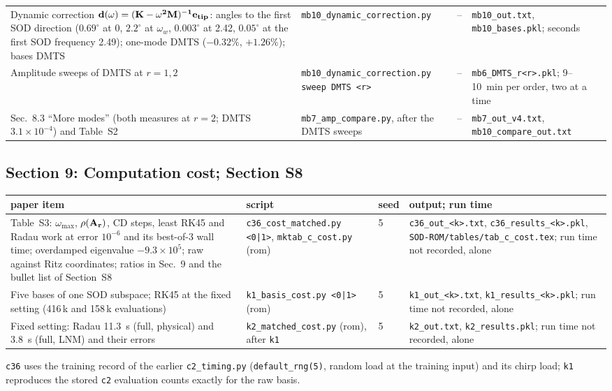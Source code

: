 \documentclass[10pt]{article}
\newcommand{\f}[1]{\texttt{#1}}
\begin{document}
\begin{longtable}{L{0.31\textwidth}L{0.25\textwidth}L{0.08\textwidth}L{0.25\textwidth}}
Dynamic correction $\bf d(\omega)=(K-\omega^2 M)^{-1}e_{tip}$: angles to the first SOD direction ($0.69^\circ$ at 0, $2.2^\circ$ at $\omega_w$, $0.003^\circ$ at 2.42, $0.05^\circ$ at the first SOD frequency 2.49); one-mode DMTS ($-0.32\%$, $+1.26\%$); bases DMTS & \f{mb10\_\allowbreak{}dynamic\_\allowbreak{}correction.py} & -- & \f{mb10\_\allowbreak{}out.txt}, \f{mb10\_\allowbreak{}bases.pkl}; seconds\\
Amplitude sweeps of DMTS at $r=1,2$ & \f{mb10\_\allowbreak{}dynamic\_\allowbreak{}correction.py sweep DMTS <r>} & -- & \f{mb6\_\allowbreak{}DMTS\_\allowbreak{}r<r>.pkl}; 9--10~min per order, two at a time\\
Sec.~8.3 ``More modes'' (both measures at $r=2$; DMTS $3.1\times10^{-4}$) and Table~S2 & \f{mb7\_\allowbreak{}amp\_\allowbreak{}compare.py}, after the DMTS sweeps & -- & \f{mb7\_\allowbreak{}out\_\allowbreak{}v4.txt}, \f{mb10\_\allowbreak{}compare\_\allowbreak{}out.txt}\\
\bottomrule
\end{longtable}

\subsection*{Section 9: Computation cost; Section S8}
\begin{longtable}{L{0.31\textwidth}L{0.25\textwidth}L{0.08\textwidth}L{0.25\textwidth}}
\toprule
paper item & script & seed & output; run time\\ \midrule
Table~S3: $\omega_{\max}$, $\rho(\bf A_r)$, CD steps, least RK45 and Radau work at error $10^{-6}$ and its best-of-3 wall time; overdamped eigenvalue $-9.3\times10^5$; raw against Ritz coordinates; ratios in Sec.~9 and the bullet list of Section~S8 & \f{c36\_\allowbreak{}cost\_\allowbreak{}matched.py <0|1>}, \f{mktab\_\allowbreak{}c\_\allowbreak{}cost.py} (rom) & 5 & \f{c36\_\allowbreak{}out\_\allowbreak{}<k>.txt}, \f{c36\_\allowbreak{}results\_\allowbreak{}<k>.pkl}, \f{SOD-ROM/\allowbreak{}tables/\allowbreak{}tab\_\allowbreak{}c\_\allowbreak{}cost.tex}; run time not recorded, alone\\
Five bases of one SOD subspace; RK45 at the fixed setting (416\,k and 158\,k evaluations) & \f{k1\_\allowbreak{}basis\_\allowbreak{}cost.py <0|1>} (rom) & 5 & \f{k1\_\allowbreak{}out\_\allowbreak{}<k>.txt}, \f{k1\_\allowbreak{}results\_\allowbreak{}<k>.pkl}; run time not recorded, alone\\
Fixed setting: Radau 11.3~s (full, physical) and 3.8~s (full, LNM) and their errors & \f{k2\_\allowbreak{}matched\_\allowbreak{}cost.py} (rom), after \f{k1} & 5 & \f{k2\_\allowbreak{}out.txt}, \f{k2\_\allowbreak{}results.pkl}; run time not recorded, alone\\
\bottomrule
\end{longtable}
\f{c36} uses the training record of the earlier \f{c2\_\allowbreak{}timing.py} (\f{default\_\allowbreak{}rng(5)}, random load at the training input) and its chirp load; \f{k1} reproduces the stored \f{c2} evaluation counts exactly for the raw basis.
\end{document}
